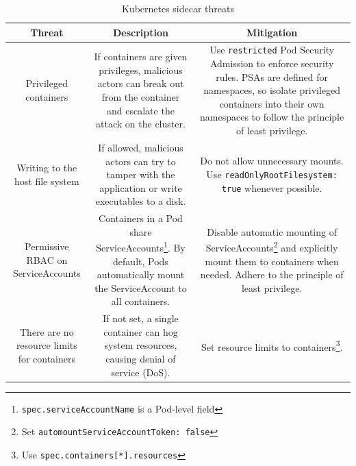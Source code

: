\documentclass[english, 12pt, a4paper, sci, utf8, a-2b, online]{aaltothesis}
\begin{document}
\begin{table}[H]
  \sffamily
  \centering

  \caption{Kubernetes sidecar threats}
  \label{table:threat-model}

  \begin{minipage}{\textwidth}
  \renewcommand{\thempfootnote}{\arabic{mpfootnote}} %
  \begin{tabularx}{\textwidth}{CCC}
    \hline
    \textbf{Threat} & \textbf{Description} & \textbf{Mitigation} \\ \hline
    Privileged containers & If containers are given privileges, malicious actors can break out from the container and escalate the attack on the cluster. & Use \lstinline{restricted} Pod Security Admission to enforce security rules. PSAs are defined for namespaces, so isolate privileged containers into their own namespaces to follow the principle of least privilege. \\ \hline
    Writing to the host file system & If allowed, malicious actors can try to tamper with the application or write executables to a disk. & Do not allow unnecessary mounts. Use \lstinline{readOnlyRootFilesystem: true} whenever possible. \\ \hline
    Permissive RBAC on ServiceAccounts & Containers in a Pod share ServiceAccounts\footnote{\lstinline{spec.serviceAccountName} is a Pod-level field}. By default, Pods automatically mount the ServiceAccount to all containers. & Disable automatic mounting of ServiceAccounts\footnote{Set \lstinline{automountServiceAccountToken: false}} and explicitly mount them to containers when needed. Adhere to the principle of least privilege. \\ \hline
    There are no resource limits for containers & If not set, a single container can hog system resources, causing denial of service (DoS). & Set resource limits to containers\footnote{Use \lstinline{spec.containers[*].resources}}. \\ \hline
  \end{tabularx}
  \end{minipage}
\end{table}
\end{document}
